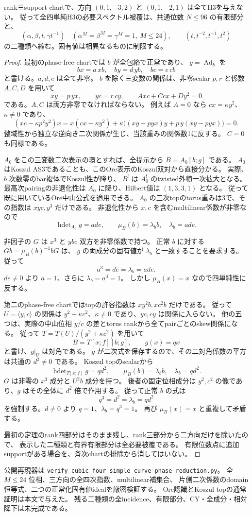 \begin{theorem}[二つのrank三曲線chartの全排除]
\label{thm:cubic-first-two-rank3-curves-empty}
rank三support chartで、方向 $(0,1,-3,2)$ と $(0,1,-2,1)$ は全てH3を与えない。
従って全四単純H3の必要スペクトル被覆は、共通位数 $N\le96$ の有限部分と、
\[
 (\alpha,\beta,t,\gamma t^{-1})\quad
 (\alpha^M=\beta^M=\gamma^M=1,\ M\le24),
 \qquad (t,t^{-2},t^{-1},t^2)
\]
の二種類へ縮む。固有値は相異なるものに制限する。
\end{theorem}
\begin{proof}
最初のphase-free chartでは $b$ が全包絡で正常であり、
$g=\operatorname{Ad}_b$ を
\[
 bx=a\,xb,\quad by=d\,yb,\quad bc=e\,cb
\]
と書ける。$a,d,e$ は全て非零。
$b$ を除く三変数の関係は、非零scalar $p,r$ と係数 $A,C,D$ を用いて
\[
 xy=p\,yx,\qquad yc=r\,cy,\qquad Axc+Ccx+Dy^2=0
\]
である。$A,C$ は両方非零でなければならない。
例えば $A=0$ なら $cx=\kappa y^2$、$\kappa\ne0$ であり、
\[
 (xc-\kappa p^2y^2)x
 =x(cx-\kappa y^2)+\kappa\bigl((xy-pyx)y+p\,y(xy-pyx)\bigr)=0.
\]
整域性から独立な逆向き二次関係が生じ、当該重みの関係数1に反する。
$C=0$ も同様である。

$A_0$ をこの三変数二次表示の環とすれば、全提示から
$B=A_0[b;g]$ である。
$A_0$ はKoszul AS3であることも、このOre表示のKoszul双対から直接分かる。
実際、$b$ 次数零のbar複体でKoszul性が降り、
$B^!$ は $A_0^!$ のtwisted外積一次拡大となる。
最高次pairingの非退化性は $A_0^!$ に降り、Hilbert値は $(1,3,3,1)$ となる。
従って既に用いているOre中山公式を適用できる。
$A_0$ の三次topのtorus重みは3で、その指数は $xyc,y^3$ だけである。
非退化性から $x,c$ を含むmultilinear係数が非零なので
\[
 \operatorname{hdet}_{A_0}g=ade,\qquad \mu_B(b)=\lambda_b b,\quad \lambda_b=ade.
\]

非因子の $G$ は $x^3$ と $ybc$ 双方を非零係数で持つ。
正常 $b$ に対する $Gb=\mu_B(b)^{-1}bG$ は、
$g$ の両成分の固有値が $\lambda_b$ と一致することを要求する。
従って
\[
 a^3=de=\lambda_b=ade.
\]
$de\ne0$ より $a=1$、さらに $\lambda_b=a^3=1$。
しかし $\mu_B(x)=x$ なので四単純性に反する。

第二のphase-free chartではtopの許容指数は $xy^2b,xc^2b$ だけである。
従って $U=\langle y,c\rangle$ の関係は
$y^2+\kappa c^2$、$\kappa\ne0$ であり、$yc,cy$ は関係に入らない。
他の五つは、実際の中山位相 $y/c$ の差とtorus rankから全てpairごとのskew関係になる。
従って $T=T(U)/(y^2+\kappa c^2)$ を用いて
\[
 B=T[x;f][b;g],\qquad g(x)=q x
\]
と書け、$g|_U$ は対角である。
$g$ が二次式を保存するので、その二対角係数の平方は共通の $d^2\ne0$ である。
Koszul topのscalarから
\[
 \operatorname{hdet}_{T[x;f]}g=q d^2,\qquad \mu_B(b)=\lambda_b b,\quad \lambda_b=q d^2.
\]
$G$ は非零の $x^3$ 成分と $U^2b$ 成分を持つ。
後者の固定位相成分は $y^2,c^2$ の像であり、$g$ はその全体に $d^2$ 倍で作用する。
従って正常 $b$ の式は
\[
 q^3=d^2=\lambda_b=q d^2
\]
を強制する。$d\ne0$ より $q=1$、$\lambda_b=q^3=1$。
再び $\mu_B(x)=x$ と重複して矛盾する。

最初の定理のrank四部分はそのまま残し、rank三部分から二方向だけを除いたので、
表示した二種類と有界有限部分は全必要被覆である。
有限位数点に追加supportがある場合を、斉次chartの排除から消してはいない。
\end{proof}

公開再現器は \texttt{verify\_cubic\_four\_simple\_curve\_phase\_reduction.py}。
全 $M\le24$ 位相、三方向の全四次指数、multilinear補集合、
片側二次係数のdomain恒等式、二つの正常化固有値idealを厳密検証する。
Ore認識とKoszul topの通常証明は本文で与えた。
残る二種類の全incidence、有限部分、CY・全成分・相対降下は未完成である。
